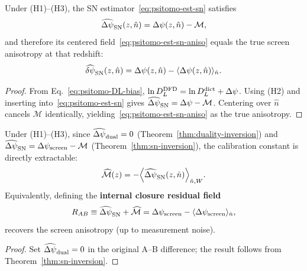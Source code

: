 \begin{theorem}\label{thm:sn-inversion}
Under (H1)--(H3), the SN estimator~\eqref{eq:psitomo-est-sn} satisfies
\begin{equation}
\widehat{\Delta\psi}_{\rm SN}(z,\hat n)=\Delta\psi(z,\hat n)-\mathcal{M},
\label{eq:closure-sn-offset}
\end{equation}
and therefore its centered field~\eqref{eq:psitomo-est-sn-aniso} equals the true screen anisotropy at that redshift:
\begin{equation}
\widehat{\delta\psi}_{\rm SN}(z,\hat n)=\Delta\psi(z,\hat n)-\langle \Delta\psi(z,\hat n)\rangle_{\hat n}.
\label{eq:closure-sn-aniso}
\end{equation}
\end{theorem}

\begin{proof}
From Eq.~\eqref{eq:psitomo-DL-bias}, $\ln D_L^{\rm DFD}=\ln D_L^{\rm dict}+\Delta\psi$. Using (H2) and inserting into~\eqref{eq:psitomo-est-sn} gives $\widehat{\Delta\psi}_{\rm SN}=\Delta\psi-\mathcal{M}$. Centering over $\hat n$ cancels $\mathcal{M}$ identically, yielding~\eqref{eq:psitomo-est-sn-aniso} as the true anisotropy.
\end{proof}

\begin{corollary}\label{cor:ab-closure}
Under (H1)--(H3), since $\widehat{\Delta\psi}_{\rm dual}=0$ (Theorem~\ref{thm:duality-inversion}) and $\widehat{\Delta\psi}_{\rm SN}=\Delta\psi_{\rm screen}-\mathcal{M}$ (Theorem~\ref{thm:sn-inversion}), the calibration constant is directly extractable:
\begin{equation}
\widehat{\mathcal{M}}(z)=
-\Big\langle \widehat{\Delta\psi}_{\rm SN}(z,\hat n)\Big\rangle_{\hat n,W}.
\label{eq:closure-ab-offset}
\end{equation}
Equivalently, defining the \textbf{internal closure residual field}
\begin{equation}
R_{AB}\equiv
\widehat{\Delta\psi}_{\rm SN}+\widehat{\mathcal{M}}
= \Delta\psi_{\rm screen} - \langle\Delta\psi_{\rm screen}\rangle_{\hat n},
\label{eq:closure-residual}
\end{equation}
recovers the screen anisotropy (up to measurement noise).
\end{corollary}

\begin{proof}
Set $\widehat{\Delta\psi}_{\rm dual}=0$ in the original A--B difference; the result follows from Theorem~\ref{thm:sn-inversion}.
\end{proof}


